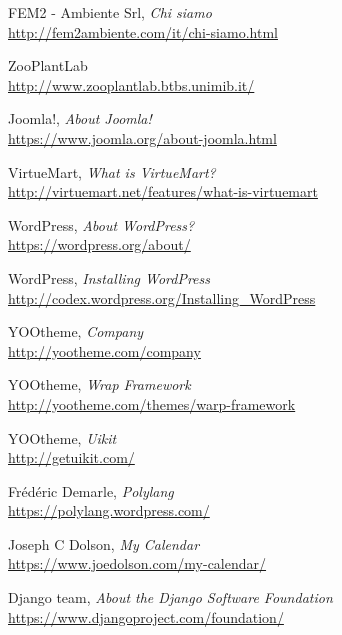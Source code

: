 \begin{thebibliography}{99}

	FEM2 - Ambiente Srl, \emph{Chi siamo} \\
	\url{http://fem2ambiente.com/it/chi-siamo.html}

	ZooPlantLab \\
	\url{http://www.zooplantlab.btbs.unimib.it/}

	Joomla!, \emph{About Joomla!} \\
	\url{https://www.joomla.org/about-joomla.html}

	VirtueMart, \emph{What is VirtueMart?} \\
	\url{http://virtuemart.net/features/what-is-virtuemart}
	
	WordPress, \emph{About WordPress?} \\
	\url{https://wordpress.org/about/}
	
	WordPress, \emph{Installing WordPress} \\
	\url{http://codex.wordpress.org/Installing_WordPress}	
	
	YOOtheme, \emph{Company} \\
	\url{http://yootheme.com/company}	

	YOOtheme, \emph{Wrap Framework} \\
	\url{http://yootheme.com/themes/warp-framework}	
	
	YOOtheme, \emph{Uikit} \\
	\url{http://getuikit.com/}	

	Frédéric Demarle, \emph{Polylang} \\
	\url{https://polylang.wordpress.com/}	

	Joseph C Dolson, \emph{My Calendar} \\
	\url{https://www.joedolson.com/my-calendar/}

	Django team, \emph{About the Django Software Foundation} \\
	\url{https://www.djangoproject.com/foundation/}

	
\end{thebibliography}